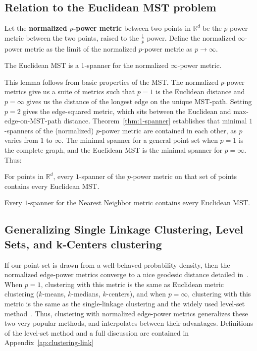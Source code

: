 \subsection{Relation to the Euclidean MST problem}
  \begin{definition}
  Let the \textbf{normalized $p$-power metric} between two points in
  $\mathbb{R}^d$ be the $p$-power metric between the two points,
  raised to the $\frac{1}{p}$ power. Define the normalized $\infty$-power
  metric as the limit of the normalized $p$-power metric as $p \rightarrow \infty$.
  \end{definition}
  \begin{lemma} The Euclidean MST is a
  $1$-spanner for the normalized $\infty$-power metric.
  \end{lemma}
  This lemma follows from basic properties of the MST.
  The normalized $p$-power metrics give us a suite of
  metrics such that $p=1$ is the Euclidean
  distance and $p=\infty$ gives us the distance of the longest edge on the
  unique MST-path.  Setting $p=2$ gives the edge-squared metric, which
  sits between the Euclidean and max-edge-on-MST-path distance. 
  Theorem~\ref{thm:1-spanner} establishes
  that minimal $1$-spanners of the (normalized) $p$-power
  metric are contained in each other, as $p$ varies from
  $1$ to $\infty$. The minimal spanner for a general point set when $p=1$ is the complete graph, and
 the Euclidean MST is the minimal spanner for $p=\infty$. Thus:
  \begin{theorem} 
    For points in $\mathbb{R}^d$, every $1$-spanner of the $p$-power
    metric on that set of points contains every Euclidean MST.
  \end{theorem}
  \begin{corollary}
    Every $1$-spanner for the Nearest Neighbor metric
    contains every Euclidean
    MST. 
  \end{corollary}
  \subsection{Generalizing Single Linkage Clustering, Level Sets, and k-Centers
  clustering}
  If our point set is drawn from a well-behaved probability
  density, then the normalized edge-power metrics
  converge to a nice geodesic distance detailed
  in~\cite{hwang2016}. When $p=1$, clustering with this metric is
  the same as Euclidean metric clustering ($k$-means,
  $k$-medians, $k$-centers), and when $p=\infty$, clustering with
  this metric is the same as the single-linkage clustering and the widely
used level-set method~\cite{Wishart69, Gower1969, Ester1996,OPTICS96}.
Thus, clustering with normalized edge-power metrics generalizes these two
very popular methods, and interpolates between their advantages.
Definitions of the level-set method and a full discussion are contained in
Appendix~\ref{ap:clustering-link}

